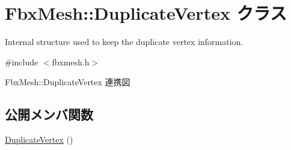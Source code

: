 \hypertarget{class_fbx_mesh_1_1_duplicate_vertex}{}\section{Fbx\+Mesh\+:\+:Duplicate\+Vertex クラス}
\label{class_fbx_mesh_1_1_duplicate_vertex}


Internal structure used to keep the duplicate vertex information.  




{\ttfamily \#include $<$fbxmesh.\+h$>$}



Fbx\+Mesh\+:\+:Duplicate\+Vertex 連携図
\subsection*{公開メンバ関数}
\begin{DoxyCompactItemize}
\item 
\hyperlink{class_fbx_mesh_1_1_duplicate_vertex_ab282bd63e5da364fa288e90b1590d0bc}{Duplicate\+Vertex} ()
\end{DoxyCompactItemize}
